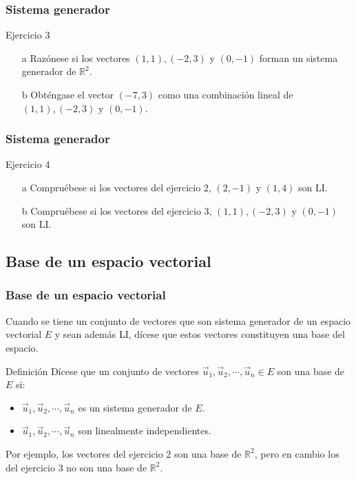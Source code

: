 \documentclass{beamer}
\begin{document}
     \begin{frame}
  \frametitle{Sistema generador}
  \begin{block}{Ejercicio 3}
\begin{itemize}
\item[a] Raz\'onese si los vectores $(1,1),(-2,3)$ y $(0,-1)$ forman un sistema generador de $\mathbb R^2$.
\item[b] Obt\'engase el vector $(-7,3)$ como una combinaci\'on lineal de $(1,1),(-2,3)$ y $(0,-1)$.
\end{itemize}
\end{block}
  \end{frame}
  
  
      \begin{frame}
  \frametitle{Sistema generador}
  \begin{block}{Ejercicio 4}
\begin{itemize}
\item[a] Compru\'ebese si los vectores del ejercicio 2, $(2,-1)$ y $(1,4)$ son LI.
\item[b] Compru\'ebese si los vectores del ejercicio 3, $(1,1),(-2,3)$ y $(0,-1)$ son LI.
\end{itemize}
\end{block}
  \end{frame}
  
  
  
  \subsection{Base de un espacio vectorial}

     \begin{frame}
  \frametitle{Base de un espacio vectorial}
  Cuando se tiene un conjunto de vectores que son sistema generador de un espacio vectorial $E$ y sean adem\'as LI, d\'icese que estos vectores constituyen una base del espacio.
  \begin{block}{Definici\'on}
D\'icese que un conjunto de vectores $\vec u_1,\vec u_2,\cdots, \vec u_n\in E$ son una base de $E$ si:
\begin{itemize}
\item $\vec u_1,\vec u_2,\cdots, \vec u_n$ es un sistema generador de $E$.
\item $\vec u_1,\vec u_2,\cdots, \vec u_n$ son linealmente independientes.
\end{itemize}
\end{block}
Por ejemplo, los vectores del ejercicio 2 son una base de $\mathbb R^2$, pero en cambio los del ejercicio 3 no son una base de $\mathbb R^2$.

  \end{frame}
  
\end{document}
